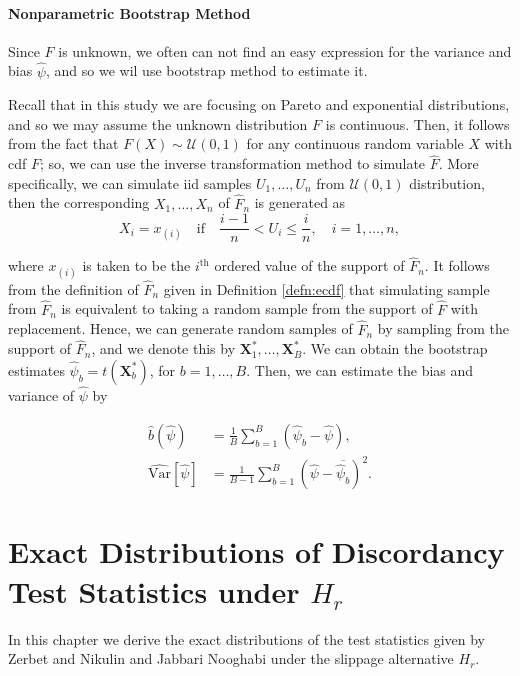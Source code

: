 \documentclass{report}
\begin{document}
\subsubsection{Nonparametric Bootstrap Method} \label{sec: bootstrap}

Since $F$ is unknown, we often can not find an easy expression for the variance and bias $\hat \psi$, and so we wil use
bootstrap method to estimate it.

Recall that in this study we are focusing on Pareto and exponential distributions, and so we may assume the unknown distribution $F$ is continuous.
Then, it follows from the fact that $F(X) \sim \mathcal U(0,1)$ for any continuous random variable $X$ with cdf $F$; so, we can
use the inverse transformation method to simulate $\hat F$. More specifically, we can simulate iid samples $U_1,\ldots, U_n$ from $\mathcal U(0,1)$
distribution, then the corresponding $X_1,\ldots, X_n$ of $\hat F_n$ is generated as
\[ 
    X_i = x_{(i)} \quad \text{if} \quad \frac{i-1}{n} < U_i \leqslant \frac{i}{n}, \quad i = 1,\ldots,n,
\]

where $x_{(i)}$ is taken to be the $i^{\text{th}}$ ordered value of the support of $\hat F_n$. It follows from the definition of $\hat F_n$ given
in Definition \ref{defn:ecdf} that simulating sample from $\hat F_n$ is equivalent to taking a random sample from the support of $\hat F$ with replacement.
Hence, we can generate random samples of $\hat F_n$ by sampling from the support of $\hat F_n$, and we denote this by
$\mathbf X^*_1,\ldots, \mathbf X^*_B$. We can obtain the bootstrap estimates $\hat \psi_b = t(\mathbf X^*_b)$, for $b =1,\ldots, B$.
Then, we can estimate the bias and variance of $\hat \psi$ by

\begin{align}
    \hat b(\hat \psi) &= \frac{1}{B} \sum_{b=1}^B (\hat \psi_b - \hat \psi), \label{eqn: boot bias}
    \\
    \widehat{\mathrm{Var}}[\hat{\psi}] &= \frac{1}{B-1} \sum_{b=1}^B \left(\hat \psi - \overline{\hat \psi_b}\right)^2. \label{eqn: boot var}
\end{align}


\chapter{Exact Distributions of Discordancy Test Statistics under $H_r$ } \label{chapt: Discordancy Tests}

In this chapter we derive the exact distributions of the test statistics given by Zerbet and Nikulin \cite{zerbet2003new} and  Jabbari Nooghabi \cite{jabbari2019detecting}
under the slippage alternative $H_r$.
\end{document}
